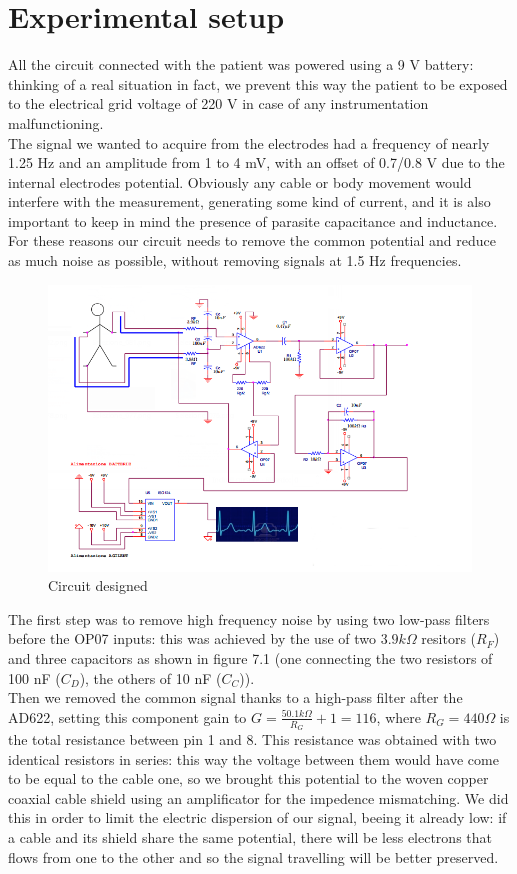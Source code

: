 \section{Experimental setup}
All the circuit connected with the patient was powered using a 9 V battery: thinking of a real situation in fact, we prevent this way the patient to be exposed to the electrical grid voltage of 220 V in case of any instrumentation malfunctioning.\\
The signal we wanted to acquire from the electrodes had a frequency of nearly 1.25 Hz and an amplitude from 1 to 4 mV, with an offset of 0.7/0.8 V due to the internal electrodes potential. Obviously any cable or body movement would interfere with the measurement, generating some kind of current, and it is also important to keep in mind the presence of parasite capacitance and inductance. For these reasons our circuit needs to remove the common potential and reduce as much noise as possible, without removing signals at 1.5 Hz frequencies.\\
\begin{figure}[H]
\centering
\includegraphics[width=.8\textwidth]{8/circuit.png}
\caption{Circuit designed}
\end{figure}
The  first step was to remove high frequency noise by using two low-pass filters before the OP07 inputs: this was achieved by the use of two $3.9 k\Omega$ resitors ($R_F$) and three capacitors as shown in figure 7.1 (one connecting the two resistors of 100 nF ($C_D$), the others of 10 nF ($C_C$)).\\
Then we removed the common signal thanks to a high-pass filter after the AD622, setting this component gain to $G =   \frac{50.1 k\Omega}{R_G} + 1 = 116$, where $R_G = 440 \Omega$ is the total resistance between pin 1 and 8. This resistance was obtained with two identical resistors in series: this way the voltage between them would have come to be equal to the cable one, so we brought this potential to the woven copper coaxial cable shield using an amplificator for the impedence mismatching. We did this in order to limit the electric dispersion of our signal, beeing it already low: if a cable and its shield share the same potential, there will be less electrons that flows from one to the other and so the signal travelling will be better preserved.\\
